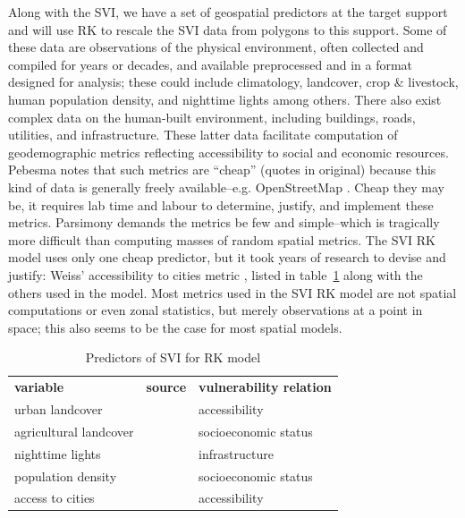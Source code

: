 \documentclass[]{interact}
\theoremstyle{plain}%
\theoremstyle{definition}
\theoremstyle{remark}
\begin{document}
Along with the SVI, we have a set of geospatial predictors at the target support and will use RK to rescale the SVI data from polygons to this support.  Some of these data are observations of the physical environment, often collected and compiled for years or decades, and available preprocessed and in a format designed for analysis; these could include climatology, landcover, crop \& livestock, human population density, and nighttime lights among others.  There also exist complex data on the human-built environment, including buildings, roads, utilities, and infrastructure.  These latter data facilitate computation of geodemographic metrics reflecting accessibility to social and economic resources.  Pebesma \citep{pebesma06} notes that such metrics are ``cheap'' (quotes in original) because this kind of data is generally freely available--e.g. OpenStreetMap \citep{osm}.  Cheap they may be, it requires lab time and labour to determine, justify, and implement these metrics.  Parsimony demands the metrics be few and simple--which is tragically more difficult than computing masses of random spatial metrics.  The SVI RK model uses only one cheap predictor, but it took years of research to devise and justify: Weiss' accessibility to cities metric \citep{weiss18}, listed in table~\ref{tab:predictors} along with the others used in the model.  Most metrics used in the SVI RK model are not spatial computations or even zonal statistics, but merely observations at a point in space; this also seems to be the case for most spatial models.

\begin{table}
\begin{tabular}{l p{5cm} l}
  \bf{variable} & \bf{source} & \bf{vulnerability relation} \\
  urban landcover & \citep{basevue13} & accessibility \\
  agricultural landcover & \citep{basevue13} & socioeconomic status \\
  nighttime lights & \citep{elvidge17} & infrastructure \\
  population density & \citep{landscan} & socioeconomic status \\
  access to cities & \citep{weiss18} & accessibility \\
\end{tabular}
\caption{Predictors of SVI for RK model} \label{tab:predictors}
\end{table}
\end{document}
